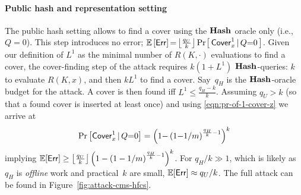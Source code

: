 \paragraph{Public hash and representation setting}
The public hash setting allows to find a cover using the $\textup{\textbf{Hash}}\hspace{0.5pt}$ oracle only  (i.e., $Q{=}0$).
This step introduces no error;
$\mathbb{E}\left[\mathsf{Err}\right]{=}\allowbreak \left\lfloor\frac{q_U}{k}\right\rfloor \Pr\hspace{-1pt}\left[\,\mathsf{Cover}^{1}_{x} \,|\, Q{=}0\,\right]$.
Given our definition of $L^1$ as the minimal number of $R(K,{\cdot})$ evaluations to find a cover,
the cover-finding step of the attack requires $k(1{+}L^1)$ $\textup{\textbf{Hash}}\hspace{0.5pt}$-queries: $k$ to evaluate $R(K,x)$, and then $kL^1$ to find a cover.
Say~$q_H$ is the $\textup{\textbf{Hash}}\hspace{0.5pt}$-oracle budget for the attack. A cover is then found iff $L^1{\leq}\frac{q_H{-}k}{k}$. 
Assuming $q_U > k$ (so that a found cover is inserted at least once) and using \eqref{eqn:pr-of-1-cover-z} we arrive at
\begin{align}\label{eqn:pub-pub-pr-cover-qH}
	\Pr\left[\mathsf{Cover}^{1}_{x} \,|\, Q{=}0\right] 
	= \left(1{-}\left(1{-}{1}/{m}\right)^{\frac{q_H}{k}{-}1}\right)^{k}
\end{align}
implying $\mathbb{E}[\mathsf{Err}] \geq \left\lfloor\frac{q_U}{k}\right\rfloor \left(1 - \left(1 - 1/m\right)^{\frac{q_H}{k}-1}\right)^{k}
$. For $q_H/k \gg 1$, which is likely as $q_H$ is \emph{offline} work and practical~$k$ are small, $\mathbb{E}[\mathsf{Err}]\approx q_U/k$. 
The full attack can be found in Figure~\ref{fig:attack-cms-hfcs}.
